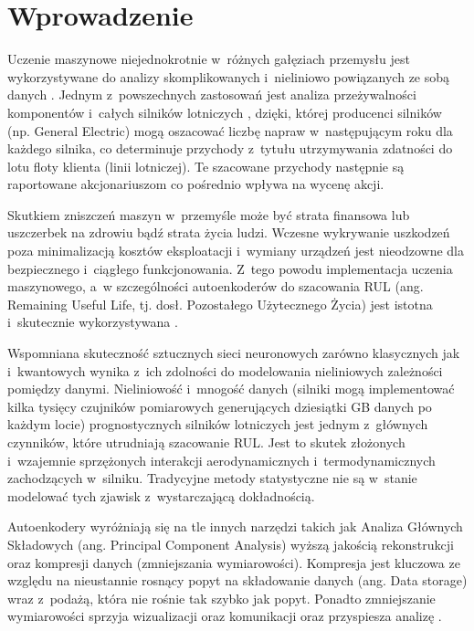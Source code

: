 \newpage
\section*{Wprowadzenie}

Uczenie maszynowe niejednokrotnie w~różnych gałęziach przemysłu jest wykorzystywane do analizy skomplikowanych i~nieliniowo powiązanych ze sobą danych \cite{review_predictive_maintenance_2023}. Jednym z~powszechnych zastosowań jest analiza przeżywalności komponentów i~całych silników lotniczych \cite{saxena2008damage}, dzięki, której producenci silników (np. General Electric) mogą oszacować liczbę napraw w~następującym roku dla każdego silnika, co determinuje przychody z~tytułu utrzymywania zdatności do lotu floty klienta (linii lotniczej). Te szacowane przychody następnie są raportowane akcjonariuszom co pośrednio wpływa na wycenę akcji. 

Skutkiem zniszczeń maszyn w~przemyśle może być strata finansowa lub uszczerbek na zdrowiu bądź strata życia ludzi. Wczesne wykrywanie uszkodzeń poza minimalizacją kosztów eksploatacji i~wymiany urządzeń jest nieodzowne dla bezpiecznego i~ciągłego funkcjonowania. Z~tego powodu implementacja uczenia maszynowego, a~w szczególności autoenkoderów do szacowania RUL (ang. Remaining Useful Life, tj. dosł. Pozostałego Użytecznego Życia) jest istotna i~skutecznie wykorzystywana \cite{autoencoder_fault_detection_2022}.

Wspomniana skuteczność sztucznych sieci neuronowych zarówno klasycznych jak i~kwantowych wynika z~ich zdolności do modelowania nieliniowych zależności pomiędzy danymi. Nieliniowość i~mnogość danych (silniki mogą implementować kilka tysięcy czujników pomiarowych generujących dziesiątki GB danych po każdym locie) prognostycznych silników lotniczych jest jednym z~głównych czynników, które utrudniają szacowanie RUL. Jest to skutek złożonych i~wzajemnie sprzężonych interakcji aerodynamicznych i~termodynamicznych zachodzących w~silniku. Tradycyjne metody statystyczne nie są w~stanie modelować tych zjawisk z~wystarczającą dokładnością.

Autoenkodery wyróżniają się na tle innych narzędzi takich jak Analiza Głównych Składowych (ang. Principal Component Analysis) wyższą jakością rekonstrukcji oraz kompresji danych (zmniejszania wymiarowości). Kompresja jest kluczowa ze względu na nieustannie rosnący popyt na składowanie danych (ang. Data storage) wraz z~podażą, która nie rośnie tak szybko jak popyt. Ponadto zmniejszanie wymiarowości sprzyja wizualizacji oraz komunikacji oraz przyspiesza analizę \cite{hinton2006reducing}.

